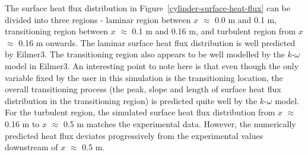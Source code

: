 The surface heat flux distribution in Figure~\ref{cylinder-surface-heat-flux}
can be divided into three regions - laminar region between $x$ $\approx$ 0.0 m 
and 0.1 m, transitioning region between $x$ $\approx$ 0.1 m and 0.16 m, and
turbulent region from $x$ $\approx$ 0.16 m onwards. The laminar surface heat 
flux distribution is well predicted by Eilmer3. The transitioning region also
appears to be well modelled by the $k$-$\omega$ model in Eilmer3. An interesting 
point to note here is that even though the only variable fixed by the user in 
this simulation is the transitioning location, the overall transitioning process 
(the peak, slope and length of surface heat flux distribution in the transitioning 
region) is predicted quite well by the $k$-$\omega$ model. For the turbulent
region, the simulated surface heat flux distribution from $x$ $\approx$ 0.16 m to
$x$ $\approx$ 0.5 m matches the experimental data. However, the numerically 
predicted heat flux deviates progressively from the experimental values downstream 
of $x$ $\approx$ 0.5 m.
%
